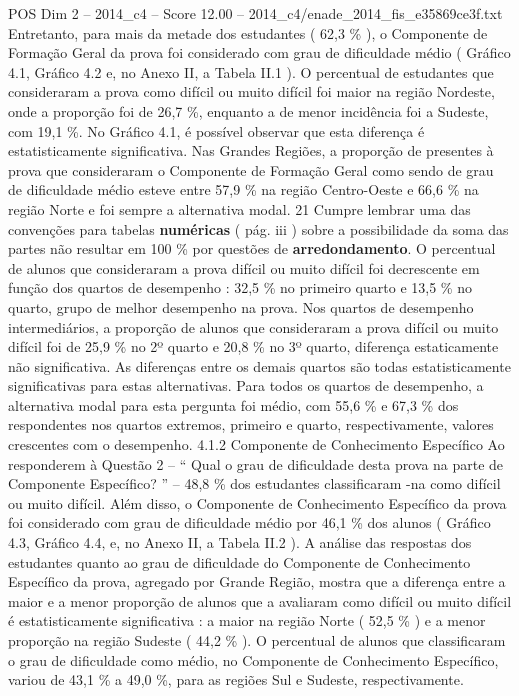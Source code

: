 \begin{textsample}{POS Dim 2 – 2014\_c4 – Score 12.00 – 2014\_c4/enade\_2014\_fis\_e35869ce3f.txt}
Entretanto, para mais da metade dos estudantes ( 62,3 \% ), o Componente de Formação Geral da prova foi considerado com grau de dificuldade médio ( Gráfico 4.1, Gráfico 4.2 e, no Anexo II, a Tabela II.1 ).
O percentual de estudantes que consideraram a prova como difícil ou muito difícil foi maior na região Nordeste, onde a proporção foi de 26,7 \%, enquanto a de menor incidência foi a Sudeste, com 19,1 \%.
No Gráfico 4.1, é possível observar que esta diferença é estatisticamente significativa.
Nas Grandes Regiões, a proporção de presentes à prova que consideraram o Componente de Formação Geral como sendo de grau de dificuldade médio esteve entre 57,9 \% na região Centro-Oeste e 66,6 \% na região Norte e foi sempre a alternativa modal. 21 Cumpre lembrar uma das convenções para tabelas \textbf{numéricas} ( pág. iii ) sobre a possibilidade da soma das partes não resultar em 100 \% por questões de \textbf{arredondamento}.
O percentual de alunos que consideraram a prova difícil ou muito difícil foi decrescente em função dos quartos de desempenho : 32,5 \% no primeiro quarto e 13,5 \% no quarto, grupo de melhor desempenho na prova.
Nos quartos de desempenho intermediários, a proporção de alunos que consideraram a prova difícil ou muito difícil foi de 25,9 \% no 2º quarto e 20,8 \% no 3º quarto, diferença estaticamente não significativa.
As diferenças entre os demais quartos são todas estatisticamente significativas para estas alternativas.
Para todos os quartos de desempenho, a alternativa modal para esta pergunta foi médio, com 55,6 \% e 67,3 \% dos respondentes nos quartos extremos, primeiro e quarto, respectivamente, valores crescentes com o desempenho. 4.1.2 Componente de Conhecimento Específico Ao responderem à Questão 2 – “ Qual o grau de dificuldade desta prova na parte de Componente Específico? ” – 48,8 \% dos estudantes classificaram -na como difícil ou muito difícil.
Além disso, o Componente de Conhecimento Específico da prova foi considerado com grau de dificuldade médio por 46,1 \% dos alunos ( Gráfico 4.3, Gráfico 4.4, e, no Anexo II, a Tabela II.2 ).
A análise das respostas dos estudantes quanto ao grau de dificuldade do Componente de Conhecimento Específico da prova, agregado por Grande Região, mostra que a diferença entre a maior e a menor proporção de alunos que a avaliaram como difícil ou muito difícil é estatisticamente significativa : a maior na região Norte ( 52,5 \% ) e a menor proporção na região Sudeste ( 44,2 \% ).
O percentual de alunos que classificaram o grau de dificuldade como médio, no Componente de Conhecimento Específico, variou de 43,1 \% a 49,0 \%, para as regiões Sul e Sudeste, respectivamente.

\end{textsample}
